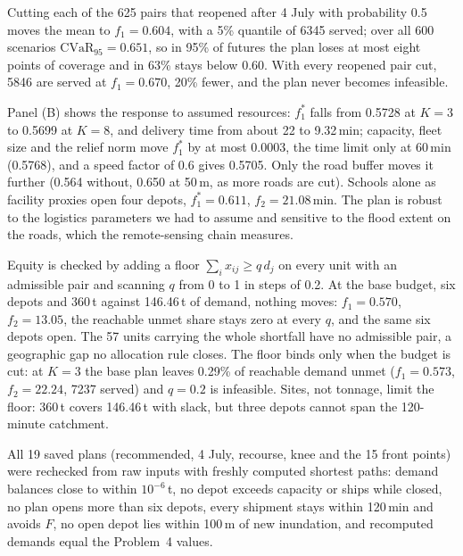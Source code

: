 Cutting each of the 625 pairs that reopened after 4 July with probability 0.5 moves the mean to $f_1=0.604$, with a 5\% quantile of 6345 served; over all 600 scenarios $\mathrm{CVaR}_{95}=0.651$, so in 95\% of futures the plan loses at most eight points of coverage and in 63\% stays below 0.60. With every reopened pair cut, 5846 are served at $f_1=0.670$, 20\% fewer, and the plan never becomes infeasible.

Panel (B) shows the response to assumed resources: $f_1^*$ falls from 0.5728 at $K=3$ to 0.5699 at $K=8$, and delivery time from about 22 to 9.32\,min; capacity, fleet size and the relief norm move $f_1^*$ by at most 0.0003, the time limit only at 60\,min (0.5768), and a speed factor of 0.6 gives 0.5705. Only the road buffer moves it further (0.564 without, 0.650 at 50\,m, as more roads are cut). Schools alone as facility proxies open four depots, $f_1^*=0.611$, $f_2=21.08$\,min. The plan is robust to the logistics parameters we had to assume and sensitive to the flood extent on the roads, which the remote-sensing chain measures.

Equity is checked by adding a floor $\sum_i x_{ij}\ge q\,d_j$ on every unit with an admissible pair and scanning $q$ from 0 to 1 in steps of 0.2. At the base budget, six depots and 360\,t against 146.46\,t of demand, nothing moves: $f_1=0.570$, $f_2=13.05$, the reachable unmet share stays zero at every $q$, and the same six depots open. The 57 units carrying the whole shortfall have no admissible pair, a geographic gap no allocation rule closes. The floor binds only when the budget is cut: at $K=3$ the base plan leaves 0.29\% of reachable demand unmet ($f_1=0.573$, $f_2=22.24$, 7237 served) and $q=0.2$ is infeasible. Sites, not tonnage, limit the floor: 360\,t covers 146.46\,t with slack, but three depots cannot span the 120-minute catchment.

All 19 saved plans (recommended, 4 July, recourse, knee and the 15 front points) were rechecked from raw inputs with freshly computed shortest paths: demand balances close to within $10^{-6}$\,t, no depot exceeds capacity or ships while closed, no plan opens more than six depots, every shipment stays within 120\,min and avoids $F$, no open depot lies within 100\,m of new inundation, and recomputed demands equal the Problem~4 values\cite{deepseek2026,qwen2026,doubao2026}.
